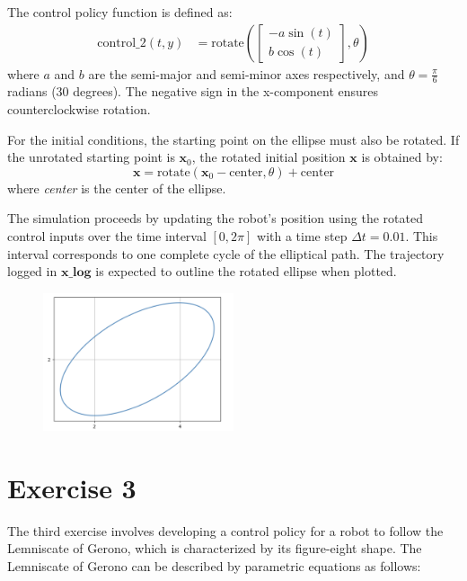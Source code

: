 \documentclass[letterpaper, 10 pt, conference]{ieeeconf}  %
\begin{document}
The control policy function is defined as:
\begin{align}
    \text{control\_2}(t, y) &= \text{rotate}\left(\begin{bmatrix} -a \sin(t) \\ b \cos(t) \end{bmatrix}, \theta\right)
\end{align}
where \( a \) and \( b \) are the semi-major and semi-minor axes respectively, and \( \theta = \frac{\pi}{6} \) radians (30 degrees). The negative sign in the x-component ensures counterclockwise rotation.

For the initial conditions, the starting point on the ellipse must also be rotated. If the unrotated starting point is \( \mathbf{x}_0 \), the rotated initial position \( \mathbf{x} \) is obtained by:
\begin{equation}
    \mathbf{x} = \text{rotate}(\mathbf{x}_0 - \text{center}, \theta) + \text{center}
\end{equation}
where \textit{center} is the center of the ellipse.

The simulation proceeds by updating the robot's position using the rotated control inputs over the time interval \( [0, 2\pi] \) with a time step \( \Delta t = 0.01 \). This interval corresponds to one complete cycle of the elliptical path. The trajectory logged in \( \mathbf{x\_log} \) is expected to outline the rotated ellipse when plotted.

\begin{figure}[htbp]
    \centering
    \includegraphics[width=0.5\textwidth]{image2.png}
\end{figure}

\section{Exercise 3}

The third exercise involves developing a control policy for a robot to follow the Lemniscate of Gerono, which is characterized by its figure-eight shape. The Lemniscate of Gerono can be described by parametric equations as follows:
\end{document}
